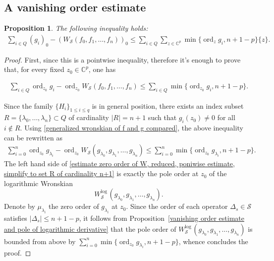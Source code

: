 \documentclass[english, 12pt]{amsart}
\DeclareMathOperator{\ord}{ord}
\def\log{\mathrm{log}\,}
\theoremstyle{plain}
\newtheorem{pro}[thm]{Proposition}
\theoremstyle{remark}
\numberwithin{equation}{section}
\theoremstyle{plain}
\theoremstyle{named}
\begin{document}
\subsection{A vanishing order estimate}
	
\begin{pro}
\label{estimation of zero divisor of w}
The following inequality  holds:
\begin{align}
\label{divisor inequality statement}
\sum_{i\in Q}(g_i)_0-(W_{\mathcal{S}}(f_0,f_1,\dots,f_n))_0
\leq
\sum_{i\in Q}
\sum_{z\in\mathbb{C}^p}\min\{\ord_z g_i,n+1-p\}\{z\}.
\end{align}
\end{pro}

\begin{proof}
First, since this is a pointwise inequality, therefore it's enough to prove that, for every fixed $z_0\in\mathbb{C}^p$, one has

\begin{align}
\label{estimate zero order of W, reduced, poniwise estimate}
\sum_{i\in Q}\ord_{z_0} g_i-
\ord_{z_0}W_{\mathcal{S}}(f_0,f_1,\dots,f_n)
\leq
\sum_{i\in Q}\min\{\ord_{z_0} g_i,n+1-p\}.
\end{align}	

Since the family $\{H_i\}_{1\leq i\leq q}$ is in general position, there exists an index subset $R=\{\lambda_0,\dots,\lambda_n\}\subset Q$ of cardinality $|R|=n+1$ such that $g_i(z_0)\not=0 $ for all $i\notin R$. Using \eqref{generalized wronskian of f and g compared}, the above inequality can be rewritten as
\begin{align}
\label{estimate zero order of W, reduced, poniwise estimate, simplify to set R of cardinality n+1}
\sum_{i=0}^n\ord_{z_0} g_{\lambda_i}-
\ord_{z_0}W_{\mathcal{S}}(g_{\lambda_0},g_{\lambda_1},\dots,g_{\lambda_n})
\leq
\sum_{i=0}^n\min\{\ord_{z_0} g_{\lambda_i},n+1-p\}.
\end{align}	
The left hand side of \eqref{estimate zero order of W, reduced, poniwise estimate, simplify to set R of cardinality n+1} is exactly the pole order at $z_0$ of the logarithmic Wronskian $$W^{\log}_{\mathcal{S}}(g_{\lambda_0},g_{\lambda_1},\dots,g_{\lambda_n}).$$
 Denote by $\mu_{\lambda_i}$ the zero order of $g_{\lambda_i}$ at $z_0$. Since the order of each operator $\Delta_s\in\mathcal{S}$ satisfies $|\Delta_s|\leq n+1-p$, it follows from Proposition~\ref{vanishing order estimate and pole of logarithmic derivative} that the pole order of $W^{\log}_{\mathcal{S}}(g_{\lambda_0},g_{\lambda_1},\dots,g_{\lambda_n})$ is bounded from above by $\sum_{i=0}^n\min\{\ord_{z_0} g_{\lambda_i},n+1-p\}$, whence concludes the proof.

\end{proof} 
	
\end{document}
